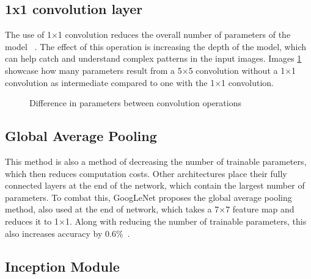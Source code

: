 \subsection{1x1 convolution layer}

The use of 1$\times$1 convolution reduces the overall number of parameters of the model ~\cite{link17}. The effect of this operation is increasing the depth of the model, which can help catch and understand complex patterns in the input images. Images \ref{fig:fig42} showcase how many parameters result from a 5$\times$5 convolution without a 1$\times$1 convolution as intermediate compared to one with the 1$\times$1 convolution. 

\begin{figure}[H]
    \caption{Difference in parameters between convolution operations}
    \label{fig:fig42}
\end{figure}

\subsection{Global Average Pooling}

This method is also a method of decreasing the number of trainable parameters, which then reduces computation costs. Other architectures place their fully connected layers at the end of the network, which contain the largest number of parameters. To combat this, GoogLeNet proposes the global average pooling method, also used at the end of network, which takes a 7$\times$7 feature map and reduces it to 1$\times$1. Along with reducing the number of trainable parameters, this also increases accuracy by 0.6\%~\cite{link17}. 

\subsection{Inception Module}

